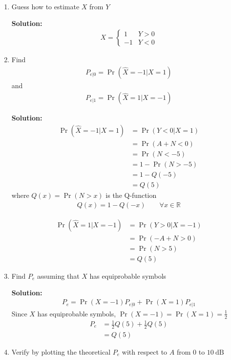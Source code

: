 \documentclass[journal,12pt,twocolumn]{IEEEtran}
\newcommand{\solution}{\noindent \textbf{Solution: }}
\providecommand{\pr}[1]{\ensuremath{\Pr\left(#1\right)}}
\numberwithin{equation}{section}
\renewcommand\thesection{\arabic{section}}
\begin{document}
\begin{enumerate}[label=\thesection.\arabic*,ref=\thesection.\theenumi]
	\item Guess how to estimate $X$ from $Y$
	
	\solution
	\begin{align}
		X = 
		\begin{cases}
			1 & Y > 0 \\
			-1 & Y < 0
		\end{cases}
	\end{align}
	
	\item Find 
	\begin{align}
		P_{e|0} = \pr{\hat{X} = -1|X=1}
	\end{align}
	and 
	\begin{align}
		P_{e|1} = \pr{\hat{X} = 1|X=-1}
	\end{align}
	
	\solution 
	\begin{align}
		\pr{\hat{X}=-1|X=1} &= \pr{Y<0|X=1} \\
		&= \pr{A+N<0} \\
		&= \pr{N<-5} \\
		&= 1 - \pr{N>-5} \\
		&= 1 - Q(-5)	\\
		&= Q(5)
	\end{align}
	where $Q(x) = \pr{N>x}$ is the Q-function	
	\begin{align}
		Q(x) = 1 - Q(-x) \qquad \forall x \in \mathbb{R}
	\end{align}
	
	\begin{align}
		\pr{\hat{X}=1|X=-1} &= \pr{Y>0|X=-1} \\
		&= \pr{-A+N>0} \\
		&= \pr{N>5} \\
		&= Q(5)		
	\end{align}
	
	\item Find $P_e$ assuming that $X$ has equiprobable symbols
	
	\solution 
	\begin{align}
		P_e = \pr{X=-1} P_{e|0} + \pr{X=1} P_{e|1}
	\end{align}
	Since $X$ has equiprobable symbols, $\pr{X=-1} = \pr{X=1} = \frac12$
	\begin{align}
		P_e &= \frac12 Q(5) + \frac12 Q(5) \\
		&= Q(5)	
	\end{align}		
	
	\item Verify by plotting the theoretical $P_e$ with respect to $A$ from $0$ to $10 ~\mathrm{dB}$
	

\end{enumerate}
\end{document}
